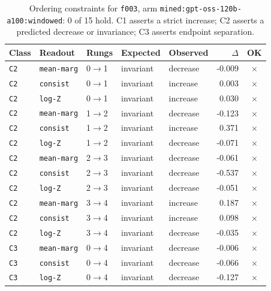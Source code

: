 \documentclass[11pt]{article}
\begin{document}
\begin{table}[htbp]
\centering
\small
\caption{Ordering constraints for \texttt{f003}, arm \texttt{mined:gpt-oss-120b-a100:windowed}: 0 of 15 hold. C1 asserts a strict increase; C2 asserts a predicted decrease or invariance; C3 asserts endpoint separation.}
\label{tab:ladder-f003-mined-gpt-oss-120b-a100-windowed}
\begin{tabular}{lllllrc}
\toprule
Class & Readout & Rungs & Expected & Observed & $\Delta$ & OK \\
\midrule
\texttt{C2} & \texttt{mean-marg} & 0$\to$1 & invariant & decrease & -0.009 & $\times$ \\
\texttt{C2} & \texttt{consist} & 0$\to$1 & invariant & increase & 0.003 & $\times$ \\
\texttt{C2} & \texttt{log-Z} & 0$\to$1 & invariant & increase & 0.030 & $\times$ \\
\texttt{C2} & \texttt{mean-marg} & 1$\to$2 & invariant & decrease & -0.123 & $\times$ \\
\texttt{C2} & \texttt{consist} & 1$\to$2 & invariant & increase & 0.371 & $\times$ \\
\texttt{C2} & \texttt{log-Z} & 1$\to$2 & invariant & decrease & -0.071 & $\times$ \\
\texttt{C2} & \texttt{mean-marg} & 2$\to$3 & invariant & decrease & -0.061 & $\times$ \\
\texttt{C2} & \texttt{consist} & 2$\to$3 & invariant & decrease & -0.537 & $\times$ \\
\texttt{C2} & \texttt{log-Z} & 2$\to$3 & invariant & decrease & -0.051 & $\times$ \\
\texttt{C2} & \texttt{mean-marg} & 3$\to$4 & invariant & increase & 0.187 & $\times$ \\
\texttt{C2} & \texttt{consist} & 3$\to$4 & invariant & increase & 0.098 & $\times$ \\
\texttt{C2} & \texttt{log-Z} & 3$\to$4 & invariant & decrease & -0.035 & $\times$ \\
\texttt{C3} & \texttt{mean-marg} & 0$\to$4 & invariant & decrease & -0.006 & $\times$ \\
\texttt{C3} & \texttt{consist} & 0$\to$4 & invariant & decrease & -0.066 & $\times$ \\
\texttt{C3} & \texttt{log-Z} & 0$\to$4 & invariant & decrease & -0.127 & $\times$ \\
\bottomrule
\end{tabular}
\end{table}
\end{document}
